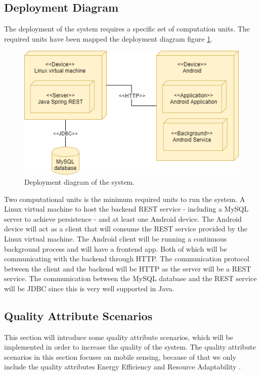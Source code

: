 \subsection{Deployment Diagram}
The deployment of the system requires a specific set of computation units. The required units have been mapped the deployment diagram figure \ref{fig:deployment_diagram}.

\begin{figure}[hbt]
\centering
\includegraphics[width=.8\textwidth]{images/Deployment_diagram}
\caption{Deployment diagram of the system.} \label{fig:deployment_diagram}
\end{figure}

Two computational units is the minimum required units to run the system. A Linux virtual machine to host the backend REST service - including a MySQL server to achieve persistence - and at least one Android device. The Android device will act as a client that will consume the REST service provided by the Linux virtual machine. The Android client will be running a continuous background process and will have a frontend app. Both of which will be communicating with the backend through HTTP. The communication protocol between the client and the backend will be HTTP as the server will be a REST service. The communication between the MySQL database and the REST service will be JDBC since this is very well supported in Java.

\subsection{Quality Attribute Scenarios}
This section will introduce some quality attribute scenarios, which will be implemented in order to increase the quality of the system. The quality attribute scenarios in this section focuses on mobile sensing, because of that we only include the quality attributes Energy Efficiency and Resource Adaptability \cite{Kjaergaard2015}.

